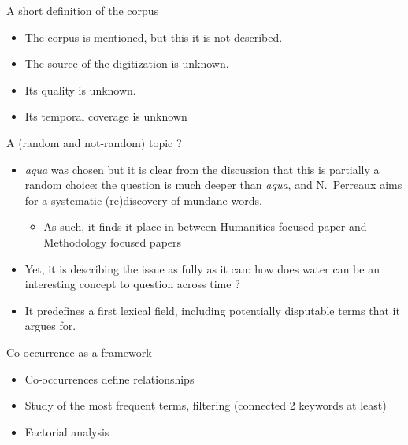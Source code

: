 \documentclass[aspectratio=169]{beamer}
\begin{document}
\begin{frame}{A short definition of the corpus}
    \begin{itemize}
        \item The corpus is mentioned, but this it is not described.
        \item The source of the digitization is unknown.
        \item Its quality is unknown.
        \item Its temporal coverage is unknown
    \end{itemize}
\end{frame}

\begin{frame}{A (random and not-random) topic ?}

    \begin{itemize}
        \item \textit{aqua} was chosen but it is clear from the discussion that this is partially a random choice: the question is much deeper than \textit{aqua}, and N.~Perreaux aims for a systematic (re)discovery of mundane words.
        \begin{itemize}
            \item As such, it finds it place in between Humanities focused paper and Methodology focused papers
        \end{itemize}
        \item Yet, it is describing the issue as fully as it can: how does water can be an interesting concept to question across time ?
        \item It predefines a first lexical field, including potentially disputable terms that it argues for.
    \end{itemize}
    
\end{frame}

\begin{frame}{Co-occurrence as a framework}
    \begin{itemize}
        \item Co-occurrences define relationships
        \item Study of the most frequent terms, filtering (connected 2 keywords at least)
        \item Factorial analysis
    \end{itemize}
\end{frame}
\end{document}
